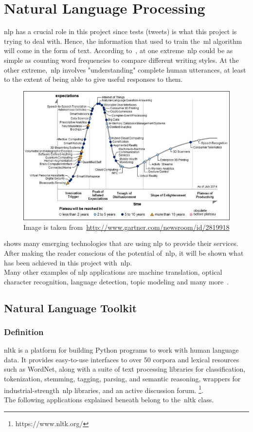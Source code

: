 \section{Natural Language Processing}
\ac{nlp} has a crucial role in this project since tests (tweets) is what this project is trying to deal with. Hence, the information that used to train the~\ac{ml} algorithm will come in the form of text. According to~\cite{bird2009natural}, at one extreme~\ac{nlp} could be as simple as counting word frequencies to compare different writing styles. At the other extreme,~\ac{nlp} involves "understanding" complete human utterances, at least to the extent of being able to give useful responses to them.\\
\begin{figure}
	\includegraphics[width=\linewidth]{img/nlp.jpg}
	\caption{Image is taken from~\url{http://www.gartner.com/newsroom/id/2819918}}
	\label{fig:nlptech}
\end{figure}
 shows many emerging technologies that are using \ac{nlp} to provide their services.
After making the reader conscious of the potential of~\ac{nlp}, it will be shown what has been achieved in this project with~\ac{nlp}. \\
Many other examples of \ac{nlp} applications are machine translation, optical character recognition, language detection, topic modeling and many more~\cite{stopwords}.

\label{sec:NLP}
\subsection{Natural Language Toolkit}
\subsubsection{Definition}
\ac{nltk} is a platform for building Python programs to work with human language data. It provides easy-to-use interfaces to over 50 corpora and lexical resources such as WordNet, along with a suite of text processing libraries for classification, tokenization, stemming, tagging, parsing, and semantic reasoning, wrappers for industrial-strength~\ac{nlp} libraries, and an active discussion forum. \footnote{https://www.nltk.org/}.\\
The following applications explained beneath belong to the~\ac{nltk} class.
